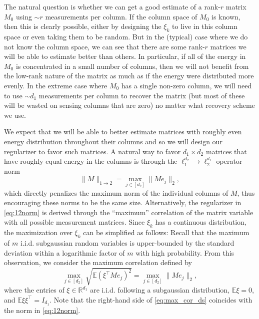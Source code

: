 \documentclass[11pt]{article}
\begin{document}
The natural question is whether we can get a good estimate of a rank-$r$ matrix $M_0$ using $\sim r$ measurements per column.  If the column space of $M_0$ is known, then this is clearly possible, either by designing the $\xi_k$ to live in this column space or even taking them to be random.  But in the (typical) case where we do not know the column space, we can see that there are some rank-$r$ matrices we will be able to estimate better than others. In particular, if all of the energy in $M_0$ is concentrated in a small number of columns, then we will not benefit from the low-rank nature of the matrix as much as if the energy were distributed more evenly.  In the extreme case where $M_0$ has a single non-zero column, we will need to use $\sim d_1$ measurements per column to recover the matrix (but most of these will be wasted on sensing columns that are zero) no matter what recovery scheme we use.

We expect that we will be able to better estimate matrices with roughly even energy distribution throughout their columns and so we will design our regularizer to favor such matrices. A natural way to favor $d_1\times d_2$ matrices that have roughly equal energy in the columns is through the  $\ell_1^{d_2}\rightarrow\ell_2^{d_1}$ operator norm
\begin{equation}
	\label{eq:12norm}
	\|M\|_{1\rightarrow 2} = \max_{j\in[d_2]} \|Me_j\|_2,
\end{equation}
which directly penalizes the maximum norm of the individual columns of $M$, thus encouraging these norms to be the same size.  
Alternatively, the regularizer in \eqref{eq:12norm} is derived through the ``maximum'' correlation of the matrix variable with all possible measurement matrices. 
Since $\xi_k$ has a continuous distribution, the maximization over $\xi_k$ can be simplified as follows: 
Recall that the maximum of $m$ i.i.d. subgaussian random variables is upper-bounded by the standard deviation within a logarithmic factor of $m$ with high probability. 
From this observation, we consider the maximum correlation defined by
\begin{equation}
\label{eq:max_cor_ds}
\max_{j \in [d_2]} \sqrt{\mathbb{E} (\xi^\top M e_j)^2} 
= \max_{j \in [d_2]} \|M e_j\|_2,
\end{equation}
where the entries of $\xi \in \mathbb{R}^{d_1}$ are i.i.d. following a subgaussian distribution, $\mathbb{E} \xi = 0$, and $\mathbb{E} \xi \xi^\top = I_{d_1}$. 
Note that the right-hand side of \eqref{eq:max_cor_ds} coincides with the norm in \eqref{eq:12norm}.
\end{document}
